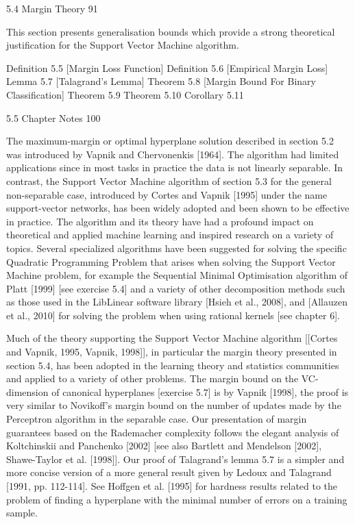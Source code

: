 5.4 Margin Theory 91

This section presents generalisation bounds which provide a strong theoretical justification for the Support Vector Machine algorithm.

Definition 5.5 [Margin Loss Function]
Definition 5.6 [Empirical Margin Loss]
Lemma 5.7 [Talagrand's Lemma]
Theorem 5.8 [Margin Bound For Binary Classification]
Theorem 5.9
Theorem 5.10
Corollary 5.11

5.5 Chapter Notes 100

The maximum-margin or optimal hyperplane solution described in section 5.2 was introduced by Vapnik and Chervonenkis [1964]. The algorithm had limited applications since in most tasks in practice the data is not linearly separable. In contrast, the Support Vector Machine algorithm of section 5.3 for the general non-separable case, introduced by Cortes and Vapnik [1995] under the name support-vector networks, has been widely adopted and been shown to be effective in practice. The algorithm and its theory have had a profound impact on theoretical and applied machine learning and inspired research on a variety of topics. Several specialized algorithms have been suggested for solving the specific Quadratic Programming Problem that arises when solving the Support Vector Machine problem, for example the Sequential Minimal Optimisation algorithm of Platt [1999] [see exercise 5.4] and a variety of other decomposition methods such as those used in the LibLinear software library [Hsieh et al., 2008], and [Allauzen et al., 2010] for solving the problem when using rational kernels [see chapter 6].

Much of the theory supporting the Support Vector Machine algorithm [[Cortes and Vapnik, 1995, Vapnik, 1998]], in particular the margin theory presented in section 5.4, has been adopted in the learning theory and statistics communities and applied to a variety of other problems. The margin bound on the VC-dimension of canonical hyperplanes [exercise 5.7] is by Vapnik [1998], the proof is very similar to Novikoff's margin bound on the number of updates made by the Perceptron algorithm in the separable case. Our presentation of margin guarantees based on the Rademacher complexity follows the elegant analysis of Koltchinskii and Panchenko [2002] [see also Bartlett and Mendelson [2002], Shawe-Taylor et al. [1998]]. Our proof of Talagrand's lemma 5.7 is a simpler and more concise version of a more general result given by Ledoux and Talagrand [1991, pp. 112-114]. See Hoffgen et al. [1995] for hardness results related to the problem of finding a hyperplane with the minimal number of errors on a training sample.

